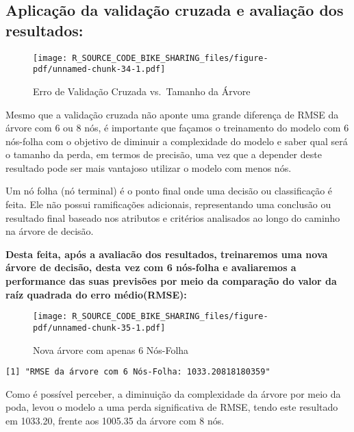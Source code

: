 \documentclass[
  letterpaper,
  DIV=11,
  numbers=noendperiod]{scrartcl}
\begin{document}
\subsection{Aplicação da validação cruzada e avaliação dos
resultados:}\label{aplicauxe7uxe3o-da-validauxe7uxe3o-cruzada-e-avaliauxe7uxe3o-dos-resultados}

\begin{figure}[H]

{\centering \texttt{[image: R\_SOURCE\_CODE\_BIKE\_SHARING\_files/figure-pdf/unnamed-chunk-34-1.pdf]}

}

\caption{Erro de Validação Cruzada vs.~Tamanho da Árvore}

\end{figure}%

Mesmo que a validação cruzada não aponte uma grande diferença de RMSE da
árvore com 6 ou 8 nós, é importante que façamos o treinamento do modelo
com 6 nós-folha com o objetivo de diminuir a complexidade do modelo e
saber qual será o tamanho da perda, em termos de precisão, uma vez que a
depender deste resultado pode ser mais vantajoso utilizar o modelo com
menos nós.

Um nó folha (nó terminal) é o ponto final onde uma decisão ou
classificação é feita. Ele não possui ramificações adicionais,
representando uma conclusão ou resultado final baseado nos atributos e
critérios analisados ao longo do caminho na árvore de decisão.

\textbf{Desta feita, após a avaliacão dos resultados, treinaremos uma
nova árvore de decisão, desta vez com 6 nós-folha e avaliaremos a
performance das suas previsões por meio da comparação do valor da raíz
quadrada do erro médio(RMSE):}

\begin{figure}[H]

{\centering \texttt{[image: R\_SOURCE\_CODE\_BIKE\_SHARING\_files/figure-pdf/unnamed-chunk-35-1.pdf]}

}

\caption{Nova árvore com apenas 6 Nós-Folha}

\end{figure}%

\begin{verbatim}
[1] "RMSE da árvore com 6 Nós-Folha: 1033.20818180359"
\end{verbatim}

Como é possível perceber, a diminuição da complexidade da árvore por
meio da poda, levou o modelo a uma perda significativa de RMSE, tendo
este resultado em 1033.20, frente aos 1005.35 da árvore com 8 nós.
\end{document}
